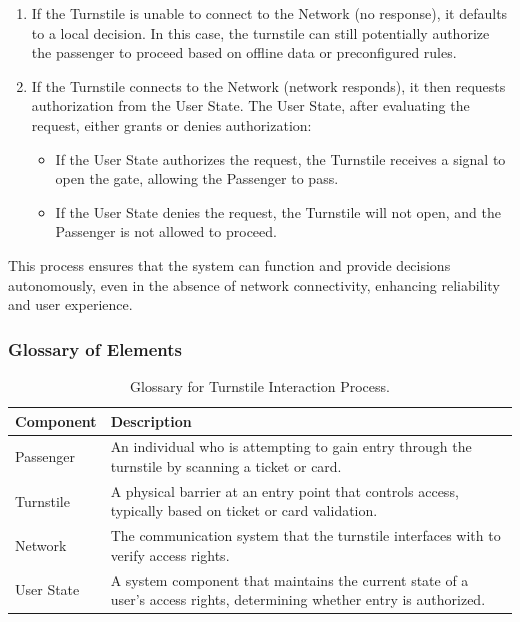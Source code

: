 \begin{enumerate}
    \item If the Turnstile is unable to connect to the Network (no response), it defaults to a local decision. In this case, the turnstile can still potentially authorize the passenger to proceed based on offline data or preconfigured rules.
    \item If the Turnstile connects to the Network (network responds), it then requests authorization from the User State. The User State, after evaluating the request, either grants or denies authorization:
    \begin{itemize}
        \item If the User State authorizes the request, the Turnstile receives a signal to open the gate, allowing the Passenger to pass.
        \item If the User State denies the request, the Turnstile will not open, and the Passenger is not allowed to proceed.
    \end{itemize}
\end{enumerate}

This process ensures that the system can function and provide decisions autonomously, even in the absence of network connectivity, enhancing reliability and user experience.

\subsubsection{Glossary of Elements}

\begin{table}[H]
    \centering
    \caption{Glossary for Turnstile Interaction Process.}
    \label{tab:turnstile_interaction_glossary}
    \begin{tabularx}{\textwidth}{@{}lX@{}} %
    \toprule
    \textbf{Component} & \textbf{Description} \\
    \midrule
    Passenger & An individual who is attempting to gain entry through the turnstile by scanning a ticket or card. \\
    Turnstile & A physical barrier at an entry point that controls access, typically based on ticket or card validation. \\
    Network & The communication system that the turnstile interfaces with to verify access rights. \\
    User State & A system component that maintains the current state of a user's access rights, determining whether entry is authorized. \\
    \bottomrule
    \end{tabularx}
\end{table}
